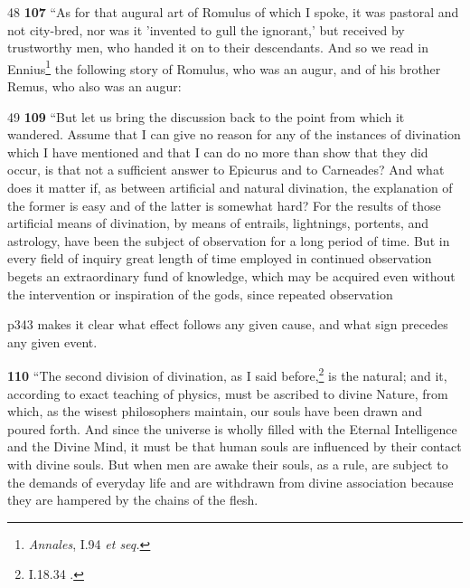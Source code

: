 48
\textbf{107} ``As for that augural art of Romulus of which I spoke, it was pastoral and not city-bred, nor was it 'invented to gull the ignorant,' but received by trustworthy men, who handed it on to their descendants. And so we read in Ennius\texthebrew{}\footnote{\emph{Annales}, I.94 \emph{et seq.}

} the following story of Romulus, who was an augur, and of his brother Remus, who also was an augur:

49
\textbf{109} ``But let us bring the discussion back to the point from which it wandered. Assume that I can give no reason for any of the instances of divination which I have mentioned and that I can do no more than show that they did occur, is that not a sufficient answer to Epicurus and to Carneades? And what does it matter if, as between artificial and natural divination, the explanation of the former is easy and of the latter is somewhat hard? For the results of those artificial means of divination, by means of entrails, lightnings, portents, and astrology, have been the subject of observation for a long period of time. But in every field of inquiry great length of time employed in continued observation begets an extraordinary fund of knowledge, which may be acquired even without the intervention or inspiration of the gods, since repeated observation

p343 makes it clear what effect follows any given cause, and what sign precedes any given event.

\textbf{110} ``The second division of divination, as I said before,\texthebrew{}\footnote{I.18.34 .

} is the natural; and it, according to exact teaching of physics, must be ascribed to divine Nature, from which, as the wisest philosophers maintain, our souls have been drawn and poured forth. And since the universe is wholly filled with the Eternal Intelligence and the Divine Mind, it must be that human souls are influenced by their contact with divine souls. But when men are awake their souls, as a rule, are subject to the demands of everyday life and are withdrawn from divine association because they are hampered by the chains of the flesh.

